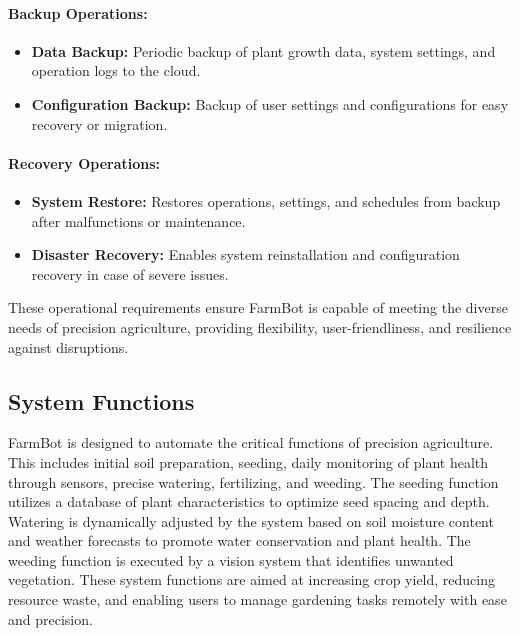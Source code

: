\paragraph{Backup Operations:}
\begin{itemize}
    \item \textbf{Data Backup:} Periodic backup of plant growth data, system settings, and operation logs to the cloud.
    \item \textbf{Configuration Backup:} Backup of user settings and configurations for easy recovery or migration.
\end{itemize}

\paragraph{Recovery Operations:}
\begin{itemize}
    \item \textbf{System Restore:} Restores operations, settings, and schedules from backup after malfunctions or maintenance.
    \item \textbf{Disaster Recovery:} Enables system reinstallation and configuration recovery in case of severe issues.
\end{itemize}

These operational requirements ensure FarmBot is capable of meeting the diverse needs of precision agriculture, providing flexibility, user-friendliness, and resilience against disruptions.




\subsection{System Functions}
FarmBot is designed to automate the critical functions of precision agriculture. This includes initial soil preparation, seeding, daily monitoring of plant health through sensors, precise watering, fertilizing, and weeding. The seeding function utilizes a database of plant characteristics to optimize seed spacing and depth. Watering is dynamically adjusted by the system based on soil moisture content and weather forecasts to promote water conservation and plant health. The weeding function is executed by a vision system that identifies unwanted vegetation. These system functions are aimed at increasing crop yield, reducing resource waste, and enabling users to manage gardening tasks remotely with ease and precision.

